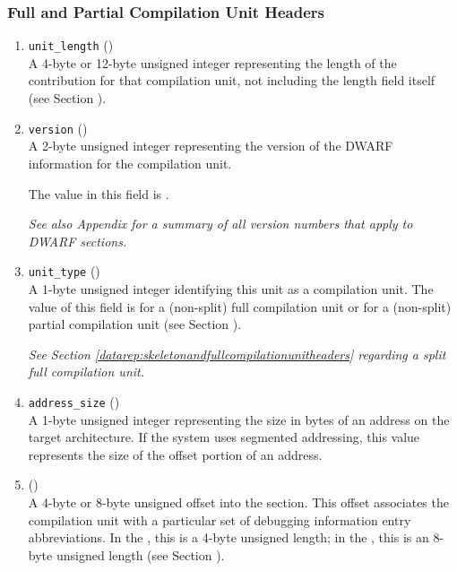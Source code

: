 \subsubsection{Full and Partial Compilation Unit Headers}
\label{datarep:compilationunitheader}
\begin{enumerate}[1. ]

\item \texttt{unit\_length} () \\
A 4-byte or 12-byte 
unsigned integer representing the length
of the \dotdebuginfo{} contribution for that compilation unit,
not including the length field itself
\bb
(see Section ).
\eb

\item  \texttt{version} (\HFTuhalf) \\
A 2-byte unsigned integer representing the version of the
DWARF information for the compilation unit.
 
The value in this field is \versiondotdebuginfo.

\textit{See also Appendix 
for a summary of all version numbers that apply to DWARF sections.}

\item \texttt{unit\_type} (\HFTubyte) \\
A 1-byte unsigned integer identifying this unit as a compilation unit.
The value of this field is 
\DWUTcompile{} for a (non-split) full compilation unit or
\DWUTpartial{} for a (non-split) partial compilation unit
(see Section ).

\textit{See Section \ref{datarep:skeletonandfullcompilationunitheaders} 
regarding a split full compilation unit.}

\item \texttt{address\_size} (\HFTubyte) \\
A 1-byte unsigned integer representing the size in bytes of
an address on the target architecture. If the system uses
segmented addressing, this value represents the size of the
offset portion of an address.

\item \HFNdebugabbrevoffset{} () \\
A 
4-byte or 8-byte unsigned offset into the 
\dotdebugabbrev{}
section. This offset associates the compilation unit with a
particular set of debugging information entry abbreviations. In
the \thirtytwobitdwarfformat, this is a 4-byte unsigned length;
in the \sixtyfourbitdwarfformat, this is an 8-byte unsigned length
(see Section ).

\end{enumerate}

